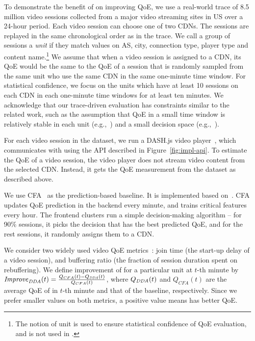 To demonstrate the benefit of \name on improving QoE, we use a real-world trace of 8.5 million video sessions collected from a major video streaming sites in US over a 24-hour period. Each video session can choose one of two CDNs.
The sessions are replayed in the same chronological order as in the trace.
We call a group of sessions a {\em unit} if they match values on AS, city, connection type, player type and content name.\footnote{The notion of unit is used to ensure statistical confidence of QoE evaluation, and is not used in \name.}
 We assume that when a video session is assigned to a CDN, its QoE would be the same to the QoE of a session that is randomly sampled from the same unit who use the same CDN in the same one-minute time window.
For statistical confidence, we focus on the units which have at least 10 sessions on each CDN in each one-minute time windows for at least ten minutes. 
We acknowledge that our trace-driven evaluation has constraints similar to the related work, such as the assumption that QoE in a small time window is relatively stable in each unit (e.g.,~\cite{via}) and a small decision space (e.g.,~\cite{cfa}).

For each video session in the dataset, we run a DASH.js video player~\cite{dashjs}, which communicates with \name using the API described in Figure~\ref{fig:impl-api}. To estimate the QoE of a video session, the video player does not stream video content from the selected CDN. Instead, it gets the QoE measurement from the dataset as described above.

We use CFA~\cite{cfa} as the prediction-based baseline. It is implemented based on~\cite{cfa}.
CFA updates QoE prediction in the backend every minute, 
and trains critical features every hour.  
The frontend clusters run a simple decision-making algorithm -- for 90\% sessions,
it picks the decision that has the best predicted QoE, and for
the rest sessions, it randomly assigns them to a CDN.

We consider two widely used video QoE metrics~\cite{sigcomm11conviva,cfa}: join time (the start-up delay of a video session), and buffering ratio (the fraction of session duration spent on rebuffering).
 We define improvement of \name for a particular unit at $t$-th minute by
  $\mathit{Improve}_{\mathit{{DDA}}}(t)=\frac{Q_{CFA}(t)-Q_{\mathit{{DDA}}}(t)}{Q_{CFA}(t)}$, where $Q_{\mathit{{DDA}}}(t)$ and $Q_{CFA}(t)$ are the average QoE of \name in $t$-th minute and that of the baseline, respectively. 
Since we prefer smaller values on both metrics, a positive 
 value means  \name has better QoE.


